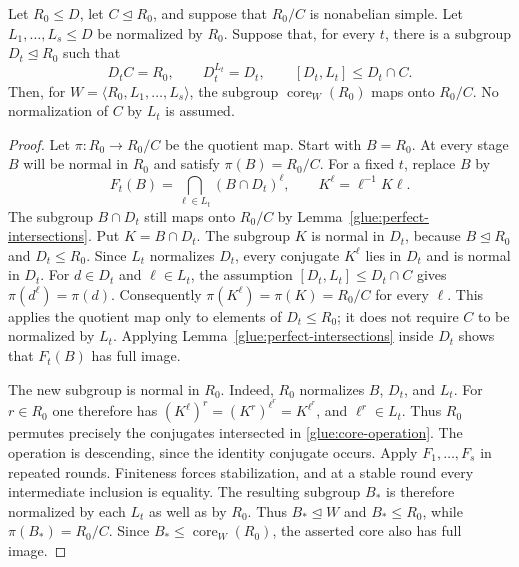 \begin{lemma}
\label{glue:retained-core}
Let $R_0\le D$, let $C\trianglelefteq R_0$, and suppose that
$R_0/C$ is nonabelian simple.  Let $L_1,\ldots,L_s\le D$ be normalized
by $R_0$.  Suppose that, for every $t$, there is a subgroup
$D_t\trianglelefteq R_0$ such that
\[
 D_tC=R_0,\qquad D_t^{L_t}=D_t,
 \qquad [D_t,L_t]\le D_t\cap C.
\]
Then, for $W=\langle R_0,L_1,\ldots,L_s\rangle$, the subgroup
$\operatorname{core}_W(R_0)$ maps onto $R_0/C$.
No normalization of $C$ by $L_t$ is assumed.
\end{lemma}
\begin{proof}
Let $\pi:R_0\to R_0/C$ be the quotient map.  Start with $B=R_0$.
At every stage $B$ will be normal in $R_0$ and satisfy
$\pi(B)=R_0/C$.  For a fixed $t$, replace $B$ by
\begin{equation}\label{glue:core-operation}
       F_t(B)=\bigcap_{\ell\in L_t}(B\cap D_t)^\ell,
       \qquad K^\ell=\ell^{-1}K\ell.
\end{equation}
The subgroup $B\cap D_t$ still maps onto $R_0/C$ by
Lemma~\ref{glue:perfect-intersections}.  Put $K=B\cap D_t$.  The subgroup $K$ is normal in $D_t$, because
$B\trianglelefteq R_0$ and $D_t\leq R_0$.  Since $L_t$ normalizes
$D_t$, every conjugate $K^\ell$ lies in $D_t$ and is normal in $D_t$.
For $d\in D_t$ and $\ell\in L_t$, the assumption
$[D_t,L_t]\leq D_t\cap C$ gives $\pi(d^\ell)=\pi(d)$.
Consequently $\pi(K^\ell)=\pi(K)=R_0/C$ for every $\ell$.
This applies the quotient map only to elements of $D_t\leq R_0$;
it does not require $C$ to be normalized by $L_t$.  Applying
Lemma~\ref{glue:perfect-intersections} inside $D_t$ shows that $F_t(B)$
has full image.

The new subgroup is normal in $R_0$.  Indeed, $R_0$ normalizes $B$, $D_t$, and $L_t$.  For $r\in R_0$
one therefore has $(K^\ell)^r=(K^r)^{\ell^r}=K^{\ell^r}$, and
$\ell^r\in L_t$.  Thus $R_0$ permutes precisely the conjugates
intersected in \eqref{glue:core-operation}.  The operation is descending, since the
identity conjugate occurs.  Apply $F_1,\ldots,F_s$ in repeated rounds.
Finiteness forces stabilization, and at a stable round every
intermediate inclusion is equality.  The resulting subgroup $B_*$
is therefore normalized by each $L_t$ as well as by $R_0$.  Thus
$B_*\trianglelefteq W$ and $B_*\le R_0$, while
$\pi(B_*)=R_0/C$.  Since
$B_*\le\operatorname{core}_W(R_0)$, the asserted core also has full
image.
\end{proof}

